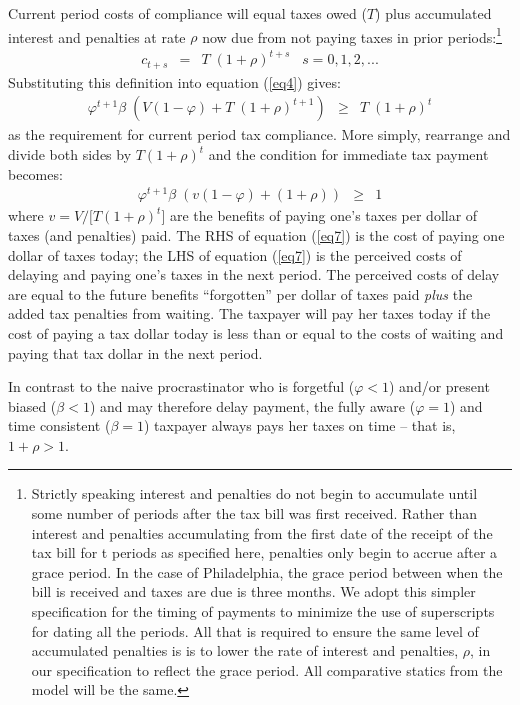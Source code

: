 \documentclass[12pt]{article}
\begin{document}
Current period costs of compliance will equal taxes owed ($T$) plus
accumulated interest and penalties at rate $\rho$ now due from not
paying taxes in prior periods:\footnote{Strictly speaking interest and
  penalties do not begin to accumulate until some number of periods
  after the tax bill was first received. Rather than interest and
  penalties accumulating from the first date of the receipt of the tax
  bill for t periods as specified here, penalties only begin to accrue
  after a grace period.  In the case of Philadelphia, the grace period
  between when the bill is received and taxes are due is three months.
  We adopt this simpler specification for the timing of payments to
  minimize the use of superscripts for dating all the periods. All
  that is required to ensure the same level of accumulated penalties
  is is to lower the rate of interest and penalties, $\rho$, in our
  specification to reflect the grace period. All comparative statics
  from the model will be the same. }
\begin{eqnarray}\label{eq5}
c_{t+s} &=& T \; (1 + \rho)^{t+s} \; \; \; s=0,1,2,...
\end{eqnarray}
Substituting this definition into equation (\ref{eq4}) gives:  
\begin{eqnarray}\label{eq6}
\varphi^{t+1} \beta \; (V (1-\varphi) + T \; (1 + \rho)^{t+1}) &\ge&
  T \; (1 + \rho)^{t}
\end{eqnarray}
as the requirement for current period tax compliance.  More simply,
rearrange and divide both sides by $T(1 + \rho)^{t}$ and the condition
for immediate tax payment becomes:
\begin{eqnarray}\label{eq7}
\varphi^{t+1} \beta \;  (v (1-\varphi) +  (1 + \rho))  &\ge&   1
\end{eqnarray}
where $v = V/[T(1 + \rho)^{t}$] are the benefits of paying one's taxes
per dollar of taxes (and penalties) paid.  The RHS of equation
(\ref{eq7}) is the cost of paying one dollar of taxes today; the LHS
of equation (\ref{eq7}) is the perceived costs of delaying and paying
one's taxes in the next period.  The perceived costs of delay are
equal to the future benefits ``forgotten'' per dollar of taxes paid
\textit{plus} the added tax penalties from waiting.  The taxpayer will
pay her taxes today if the cost of paying a tax dollar today is less
than or equal to the costs of waiting and paying that tax dollar in
the next period.

In contrast to the naive procrastinator who is forgetful ($\varphi
<1$) and/or present biased ($\beta < 1$) and may therefore delay
payment, the fully aware ($\varphi= 1$) and time consistent ($\beta =
1$) taxpayer always pays her taxes on time -- that is, $1 + \rho >
1$.
\end{document}
